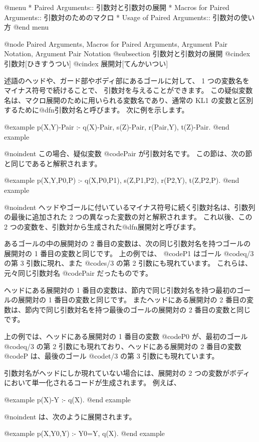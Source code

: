 @menu
* Paired Arguments::            引数対と引数対の展開
* Macros for Paired Arguments:: 引数対のためのマクロ 
* Usage of Paired Arguments::   引数対の使い方
@end menu

@node Paired Arguments, Macros for Paired Arguments, Argument Pair Notation, Argument Pair Notation
@subsection 引数対と引数対の展開
@cindex 引数対[ひきすうつい]
@cindex 展開対[てんかいつい]

述語のヘッドや、ガード部やボディ部にあるゴールに対して、 1 つの変数名を
マイナス符号で続けることで、
引数対を与えることができます。
この疑似変数名は、マクロ展開のために用いられる変数名であり、通常の KL1 の変数と区別するために@dfn{引数対名}と呼びます。
次に例を示します。

@example
p(X,Y)-Pair :- q(X)-Pair, s(Z)-Pair, r(Pair,Y), t(Z)-Pair.
@end example

@noindent
この場合、疑似変数 @code{Pair} が引数対名です。
この節は、次の節と同じであると解釈されます。

@example
p(X,Y,P0,P) :- q(X,P0,P1), s(Z,P1,P2), r(P2,Y), t(Z,P2,P).
@end example

@noindent
ヘッドやゴールに付いているマイナス符号に続く引数対名は、引数列の最後に追加された 2 つの異なった変数の対と解釈されます。
これ以後、この 2 つの変数を、引数対から生成された@dfn{展開対}と呼びます。

あるゴールの中の展開対の 2 番目の変数は、次の同じ引数対名を持つゴールの展開対の 1 番目の変数と同じです。
上の例では、 @code{P1} はゴール @code{q/3} の第 3 引数に現れ、また @code{s/3} の第 2 引数にも現れています。
これらは、元々同じ引数対名 @code{Pair} だったものです。

ヘッドにある展開対の 1 番目の変数は、節内で同じ引数対名を持つ最初のゴールの展開対の 1 番目の変数と同じです。
またヘッドにある展開対の 2 番目の変数は、節内で同じ引数対名を持つ最後のゴールの展開対の 2 番目の変数と同じです。

上の例では、ヘッドにある展開対の 1 番目の変数 @code{P0} が、最初のゴール 
@code{q/3} の第 2 引数にも現れており、ヘッドにある展開対の 2 番目の変数 
@code{P} は、最後のゴール @code{t/3} の第 3 引数にも現れています。

引数対名がヘッドにしか現れていない場合には、展開対の 2 つの変数がボディにおいて単一化されるコードが生成されます。
例えば、

@example
p(X)-Y :- q(X).
@end example

@noindent
は、次のように展開されます。

@example
p(X,Y0,Y) :- Y0=Y, q(X).
@end example

